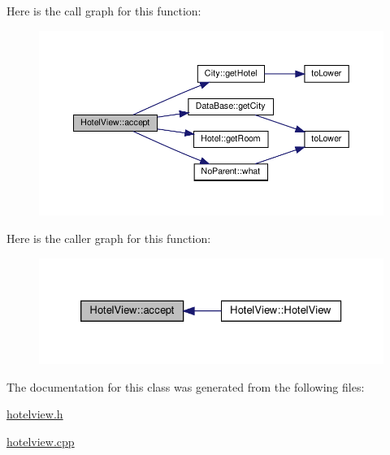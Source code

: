 Here is the call graph for this function\+:\nopagebreak
\begin{figure}[H]
\begin{center}
\leavevmode
\includegraphics[width=350pt]{class_hotel_view_a88805d7379290f2540206d384ef962a1_cgraph}
\end{center}
\end{figure}
Here is the caller graph for this function\+:\nopagebreak
\begin{figure}[H]
\begin{center}
\leavevmode
\includegraphics[width=326pt]{class_hotel_view_a88805d7379290f2540206d384ef962a1_icgraph}
\end{center}
\end{figure}


The documentation for this class was generated from the following files\+:\begin{DoxyCompactItemize}
\item 
\hyperlink{hotelview_8h}{hotelview.\+h}\item 
\hyperlink{hotelview_8cpp}{hotelview.\+cpp}\end{DoxyCompactItemize}
